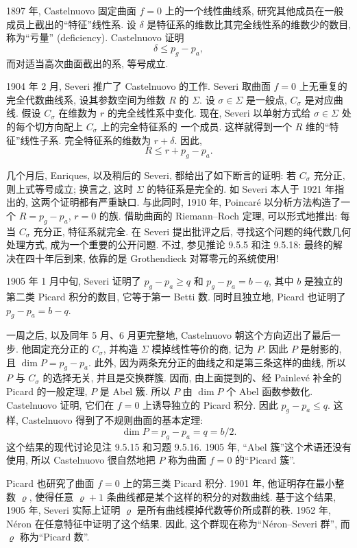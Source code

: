 1897 年, Castelnuovo 固定曲面 $f=0$ 上的一个线性曲线系, 研究其他成员在一般成员上截出的“特征”线性系. 设 $\delta$ 是特征系的维数比其完全线性系的维数少的数目, 称为“亏量” (deficiency). Castelnuovo 证明
\[
\delta\leq p_g-p_a,
\]
而对适当高次曲面截出的系, 等号成立.

1904 年 2 月, Severi 推广了 Castelnuovo 的工作. Severi 取曲面 $f=0$ 上无重复的完全代数曲线系, 设其参数空间为维数 $R$ 的 $\Sigma$. 设 $\sigma\in\Sigma$ 是一般点, $C_\sigma$ 是对应曲线. 假设 $C_\sigma$ 在维数为 $r$ 的完全线性系中变化. 现在, Severi 以单射方式给 $\sigma\in\Sigma$ 处的每个切方向配上 $C_\sigma$ 上的完全特征系的
一个成员. 这样就得到一个 $R$ 维的“特征”线性子系. 完全特征系的维数为 $r+\delta$. 因此,
\[
R\leq r+p_g-p_a.
\]

几个月后, Enriques, 以及稍后的 Severi, 都给出了如下断言的证明: 若 $C_\sigma$ 充分正, 则上式等号成立; 换言之, 这时 $\Sigma$ 的特征系是完全的. 如 Severi 本人于 1921 年指出的, 这两个证明都有严重缺口. 与此同时, 1910 年, Poincaré 以分析方法构造了一个 $R=p_g-p_a$, $r=0$ 的族. 借助曲面的 Riemann--Roch 定理, 可以形式地推出: 每当 $C_\sigma$ 充分正, 特征系就完全. 在 Severi 提出批评之后, 寻找这个问题的纯代数几何处理方式, 成为一个重要的公开问题. 不过, 参见推论 9.5.5 和注 9.5.18: 最终的解决在四十年后到来, 依靠的是 Grothendieck 对幂零元的系统使用!

1905 年 1 月中旬, Severi 证明了 $p_g-p_a\geq q$ 和 $p_g-p_a=b-q$, 其中 $b$ 是独立的第二类 Picard 积分的数目, 它等于第一 Betti 数. 同时且独立地, Picard 也证明了 $p_g-p_a=b-q$.

一周之后, 以及同年 5 月、6 月更完整地, Castelnuovo 朝这个方向迈出了最后一步. 他固定充分正的 $C_\sigma$, 并构造 $\Sigma$ 模掉线性等价的商, 记为 $P$. 因此 $P$ 是射影的, 且 $\dim P=p_g-p_a$. 此外, 因为两条充分正的曲线之和是第三条这样的曲线, 所以 $P$ 与 $C_\sigma$ 的选择无关, 并且是交换群簇. 因而, 由上面提到的、经 Painlevé 补全的 Picard 的一般定理, $P$ 是 Abel 簇. 所以 $P$ 由 $\dim P$ 个 Abel 函数参数化. Castelnuovo 证明, 它们在 $f=0$ 上诱导独立的 Picard 积分. 因此 $p_g-p_a\leq q$. 这样, Castelnuovo 得到了不规则曲面的基本定理:
\begin{equation}\tag{9.1.4}\label{ch09:eq914}
\dim P=p_g-p_a=q=b/2.
\end{equation}
这个结果的现代讨论见注 9.5.15 和习题 9.5.16. 1905 年, “Abel 簇”这个术语还没有使用, 所以 Castelnuovo 很自然地把 $P$ 称为曲面 $f=0$ 的“Picard 簇”.

Picard 也研究了曲面 $f=0$ 上的第三类 Picard 积分. 1901 年, 他证明存在最小整数 $\varrho$, 使得任意 $\varrho+1$ 条曲线都是某个这样的积分的对数曲线. 基于这个结果, 1905 年, Severi 实际上证明 $\varrho$ 是所有曲线模掉代数等价所成群的秩. 1952 年, Néron 在任意特征中证明了这个结果. 因此, 这个群现在称为“Néron--Severi 群”, 而 $\varrho$ 称为“Picard 数”.

